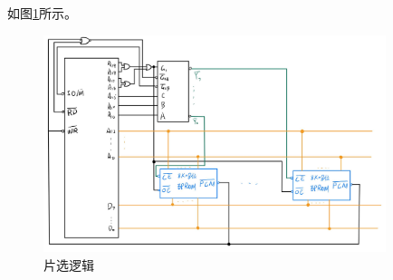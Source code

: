 \documentclass[UTF8]{report}
\newenvironment{solution}{{\noindent\hskip 2em \bf 解 \quad}}{}
\begin{document}
\begin{solution}
    如图\ref{fig:4_sup2}所示。
    \begin{figure}[!htbp]
        \centering
        \includegraphics[width=10cm]{fig/4补充2.png}
        \caption{片选逻辑}
        \label{fig:4_sup2}
    \end{figure}
\end{solution}
\end{document}
